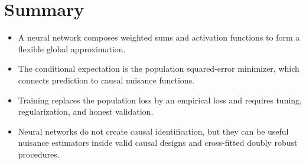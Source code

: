 \section*{Summary}

\begin{itemize}
  \item A neural network composes weighted sums and activation functions to
        form a flexible global approximation.
  \item The conditional expectation is the population squared-error minimizer,
        which connects prediction to causal nuisance functions.
  \item Training replaces the population loss by an empirical loss and requires
        tuning, regularization, and honest validation.
  \item Neural networks do not create causal identification, but they can be
        useful nuisance estimators inside valid causal designs and cross-fitted
        doubly robust procedures.
\end{itemize}
